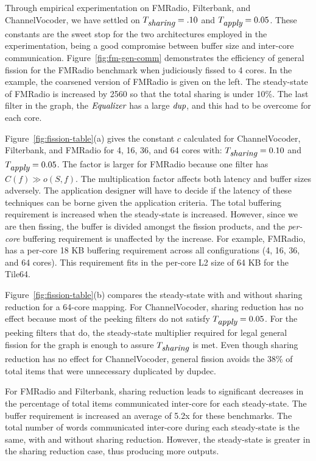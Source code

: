 Through empirical experimentation on FMRadio, Filterbank, and
ChannelVocoder, we have settled on $T_{\mbox{\it sharing}} =.10$ and
$T_{\mbox{\it apply}} = 0.05$. These constants are the sweet stop for the two
architectures employed in the experimentation, being a good compromise
between buffer size and inter-core communication.
Figure~\ref{fig:fm-gen-comm} demonstrates the efficiency of general
fission for the FMRadio benchmark when judiciously fissed to 4 cores.
In the example, the coarsened version of FMRadio is given on the left.
The steady-state of FMRadio is increased by 2560 so that the total
sharing is under 10\%.  The last filter in the graph, the
$\mbox{\it Equalizer}$ has a large $\mbox{\it dup}$, and this had to be overcome
for each core.

Figure~\ref{fig:fission-table}(a) gives the constant $c$
calculated for ChannelVocoder, Filterbank, and FMRadio for 4, 16, 36,
and 64 cores with: $T_{\mbox{\it sharing}} = 0.10$ and $T_{\mbox{\it apply}} =
0.05$.  The factor is larger for FMRadio because one filter
has $C(f) \gg o(S, f)$.  The multiplication factor affects both
latency and buffer sizes adversely.  The application designer will
have to decide if the latency of these techniques can be borne given
the application criteria.  The total buffering requirement is
increased when the steady-state is increased.  However, since we are
then fissing, the buffer is divided amongst the fission products, and
the {\it per-core} buffering requirement is unaffected by the
increase.  For example, FMRadio, has a per-core 18 KB buffering
requirement across all configurations (4, 16, 36, and 64 cores).  This
requirement fits in the per-core L2 size of 64 KB for the Tile64.

Figure~\ref{fig:fission-table}(b) compares the steady-state with and
without sharing reduction for a 64-core mapping.  For ChannelVocoder,
sharing reduction has no effect because most of the peeking filters do
not satisfy $T_{\mbox{\it apply}} = 0.05$.  For the peeking filters that do,
the steady-state multiplier required for legal general fission for the
graph is enough to assure $T_{\mbox{\it sharing}}$ is met.  Even though
sharing reduction has no effect for ChannelVocoder, general fission
avoids the 38\% of total items that were unnecessary duplicated by
dupdec.

For FMRadio and Filterbank, sharing reduction leads to significant
decreases in the percentage of total items communicated inter-core for
each steady-state.  The buffer requirement is increased an average of
5.2x for these benchmarks.  The total number of words communicated
inter-core during each steady-state is the same, with and without
sharing reduction.  However, the steady-state is greater in the
sharing reduction case, thus producing more outputs.

